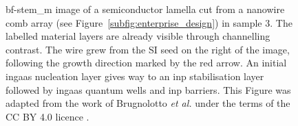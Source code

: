 \begin{figure}
    \centering
    \caption[\acs{bf}-\acs{stem_m} image of a semiconductor lamella cut from a nanowire in sample 3.]{\acs{bf}-\acs{stem_m} image of a semiconductor lamella cut from a nanowire  comb array (see Figure~\ref{subfig:enterprise_design}) in sample 3. The labelled material layers are already visible through channelling contrast. The wire grew from the \acs{SI} seed on the right of the image, following the growth direction marked by the red arrow. An initial \acs{ingaas} nucleation layer gives way to an \acs{inp} stabilisation layer followed by \acs{ingaas} quantum wells and \acs{inp} barriers. This Figure was adapted from the work of Brugnolotto \textit{et al.} \cite{Brugnolotto2023} under the terms of the CC BY 4.0 licence \cite{CCBY40}.}
    \label{fig:s3_ov}
\end{figure}

